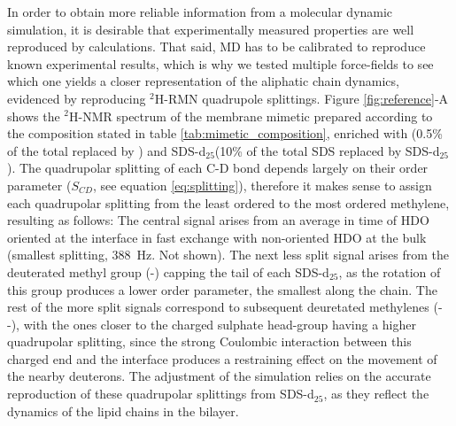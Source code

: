\documentclass[3p,preprint,review]{elsarticle}
\begin{document}
	In order to obtain more reliable information from a molecular dynamic
	simulation,
	it is desirable that experimentally measured properties are well reproduced by
	calculations. That said, MD has to be calibrated to reproduce known experimental
	results, which is why
	we
	tested multiple force-fields to see which one yields a closer representation of
	the aliphatic chain dynamics, evidenced by reproducing $^2$H-RMN quadrupole
	splittings. Figure \ref{fig:reference}-A shows the $^2$H-NMR spectrum of the
	membrane mimetic prepared according to the composition stated in table
	\ref{tab:mimetic_composition}, enriched with (0.5\% of the total
	 replaced by ) and SDS-d$_{25}$(10\% of the total SDS replaced
	by SDS-d$_{25}$). The quadrupolar splitting of each C-D bond depends largely on
	their order parameter ($S_{CD}$, see equation \ref{eq:splitting}), therefore it
	makes sense to assign each quadrupolar splitting from the least ordered to the
	most ordered methylene, resulting as follows: The central signal arises from an
	average in time of HDO oriented at the interface in fast exchange with
	non-oriented HDO at the bulk (smallest splitting, \SI{388}{Hz}. Not shown). The
	next less split signal arises from the deuterated methyl group (-)
	capping the tail of each SDS-d$_{25}$, as the rotation of this group produces a
	lower order parameter, the smallest along the chain. The rest of the more split
	signals correspond to subsequent deuretated methylenes (--), with the
	ones closer to the charged sulphate head-group having a higher quadrupolar
	splitting, since the strong Coulombic interaction between this charged end and
	the interface produces a restraining effect on the movement of the nearby
	deuterons. The adjustment of the simulation relies on the accurate reproduction
	of these quadrupolar splittings from SDS-d$_{25}$, as they reflect the dynamics
	of the lipid chains in the bilayer.\par
\end{document}
